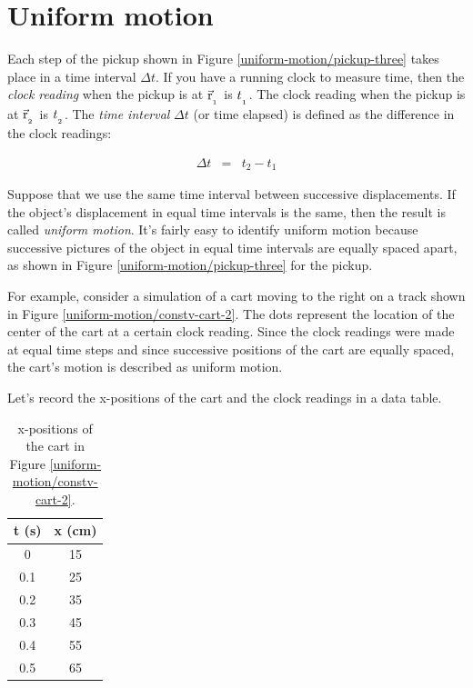\section*{Uniform motion}

Each step of the pickup shown in Figure \ref{uniform-motion/pickup-three} takes place in a time interval $\Delta t$. If you have a running clock to measure time, then the \emph{clock reading} when the pickup is at $\vec{\mathrm{r}}_{_{_{\mbox{\tiny{1}}}}}$ is ${t}_{_{_{\mbox{\tiny{1}}}}}$. The clock reading when the pickup is at $\vec{\mathrm{r}}_{_{_{\mbox{\tiny{2}}}}}$ is ${t}_{_{_{\mbox{\tiny{2}}}}}$. The \emph{time interval} $\Delta t$ (or time elapsed) is defined as the difference in the clock readings:

\begin{eqnarray*}
	\Delta t & = &t_2-t_1
\end{eqnarray*}

Suppose that we use the same time interval between successive displacements. If the object's displacement in equal time intervals is the same, then the result is called \emph{uniform motion}.  It's fairly easy to identify uniform motion because successive pictures of the object in equal time intervals are equally spaced apart, as shown in Figure \ref{uniform-motion/pickup-three} for the pickup.

For example, consider a simulation of a cart moving to the right on a track shown in Figure \ref{uniform-motion/constv-cart-2}. The dots represent the location of the center of the cart at a certain clock reading. Since the clock readings were made at equal time steps and since successive positions of the cart are equally spaced, the cart's motion is described as uniform motion.


Let's record the x-positions of the cart and the clock readings in a data table.

\begin{table}[htdp]
\caption{x-positions of the cart in Figure \ref{uniform-motion/constv-cart-2}.}
\begin{center}
\begin{tabular}{|c|c|}
\hline
t (s) & x (cm)  \\
\hline
\hline
0 & 15 \\
\hline
0.1 & 25 \\
\hline
0.2 & 35  \\
\hline
0.3 & 45  \\
\hline
0.4 & 55  \\
\hline
0.5 & 65  \\
\hline
\hline
\end{tabular}
\end{center}
\label{default}
\end{table}%

